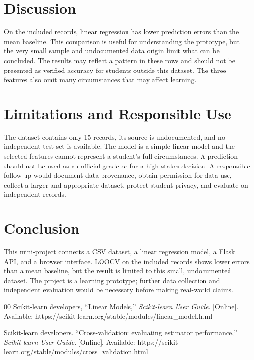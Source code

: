 \documentclass[conference]{IEEEtran}
\begin{document}
\section{Discussion}
On the included records, linear regression has lower prediction errors than
the mean baseline. This comparison is useful for understanding the prototype,
but the very small sample and undocumented data origin limit what can be
concluded. The results may reflect a pattern in these rows and should not be
presented as verified accuracy for students outside this dataset. The three
features also omit many circumstances that may affect learning.

\section{Limitations and Responsible Use}
The dataset contains only 15 records, its source is undocumented, and no
independent test set is available. The model is a simple linear model and the
selected features cannot represent a student's full circumstances. A
prediction should not be used as an official grade or for a high-stakes
decision. A responsible follow-up would document data provenance, obtain
permission for data use, collect a larger and appropriate dataset, protect
student privacy, and evaluate on independent records.

\section{Conclusion}
This mini-project connects a CSV dataset, a linear regression model, a Flask
API, and a browser interface. LOOCV on the included records shows lower errors
than a mean baseline, but the result is limited to this small,
undocumented dataset. The project is a learning prototype; further data
collection and independent evaluation would be necessary before making
real-world claims.

\begin{thebibliography}{00}
Scikit-learn developers, ``Linear Models,'' \emph{Scikit-learn User Guide}.
[Online]. Available: https://scikit-learn.org/stable/modules/linear\_model.html

Scikit-learn developers, ``Cross-validation: evaluating estimator
performance,'' \emph{Scikit-learn User Guide}. [Online]. Available:
https://scikit-learn.org/stable/modules/cross\_validation.html
\end{thebibliography}
\end{document}
